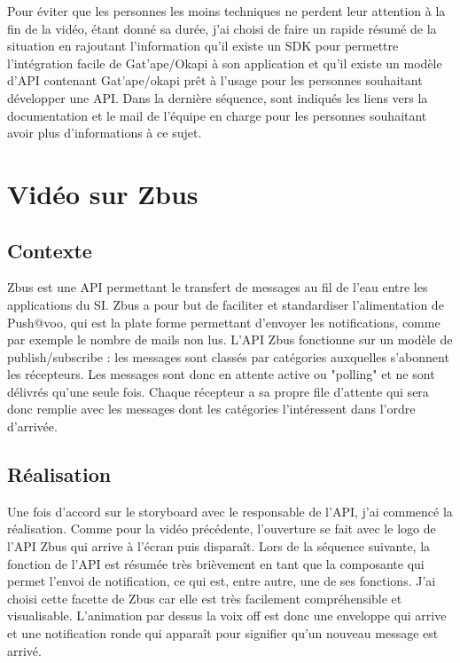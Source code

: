 Pour éviter que les personnes les moins techniques ne perdent leur attention à la fin de la vidéo, étant donné sa durée, j'ai choisi de faire un rapide résumé de la situation en rajoutant l'information qu'il existe un SDK pour permettre l'intégration facile de Gat'ape/Okapi à son application et qu'il existe un modèle d'API contenant Gat'ape/okapi prêt à l'usage pour les personnes souhaitant développer une API. Dans la dernière séquence, sont indiqués les liens vers la documentation et le mail de l'équipe en charge pour les personnes souhaitant avoir plus d'informations à ce sujet. 



\section{Vidéo sur Zbus}

\subsection{Contexte}
Zbus est une API permettant le transfert de messages au fil de l'eau entre les applications du SI. Zbus a pour but de faciliter et standardiser l'alimentation de Push@voo, qui est la plate forme permettant d'envoyer les notifications,  comme par exemple le nombre de mails non lus. L'API Zbus fonctionne sur un modèle de publish/subscribe : les messages sont classés par catégories auxquelles s'abonnent les récepteurs. Les messages sont donc en attente active ou "polling" et ne sont délivrés qu'une seule fois. Chaque récepteur a sa propre file d'attente qui sera donc remplie avec les messages dont les catégories l'intéressent dans l'ordre d'arrivée.  


\subsection{Réalisation}

Une fois d'accord sur le storyboard avec le responsable de l'API, j'ai commencé la réalisation. Comme pour la vidéo précédente, l'ouverture se fait avec le logo de l'API Zbus qui arrive à l'écran puis disparaît. Lors de la séquence suivante, la fonction de l'API est résumée très brièvement en tant que la composante qui permet l'envoi de notification, ce qui est, entre autre, une de ses fonctions. J'ai choisi cette facette de Zbus car elle est très facilement compréhensible et visualisable. L'animation par dessus la voix off est donc une enveloppe qui arrive et une notification ronde qui apparaît pour signifier qu'un nouveau message est arrivé.\\

